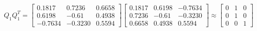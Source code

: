 \documentclass[12pt]{article}
\begin{document}
\\~\\$Q_1Q_1^T=\left[\begin{matrix} 0.1817 & 0.7236 & 0.6658 \\ 0.6198 & -0.61 & 0.4938 \\ -0.7634 & -0.3230 & 0.5594 \end{matrix}\right]\left[\begin{matrix} 0.1817 & 0.6198 & -0.7634 \\ 0.7236 & -0.61 & -0.3230 \\ 0.6658 & 0.4938 & 0.5594 \end{matrix}\right]\approx \left[\begin{matrix} 0 & 1 & 0 \\ 0 & 1 & 0 \\ 0 & 0 & 1 \end{matrix}\right]$

\newpage
\end{document}
